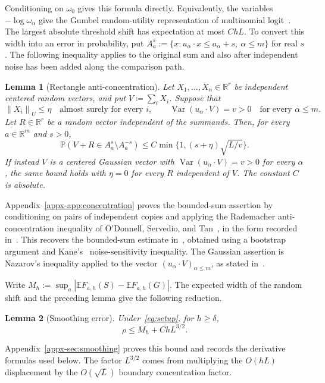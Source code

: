 \documentclass[11pt,letterpaper]{article}
\newtheorem{lemma}{Lemma}
\theoremstyle{remark}
\newcommand{\E}{\mathbb E}
\newcommand{\Pp}{\mathbb P}
\newcommand{\R}{\mathbb R}
\newcommand{\Var}{\operatorname{Var}}
\newcommand{\norm}[1]{\left\lVert#1\right\rVert}
\begin{document}
Conditioning on \(\omega_0\) gives this formula directly. Equivalently,
the variables \(-\log\omega_\alpha\) give the Gumbel random-utility
representation of multinomial logit~\cite[Section~2.6]{Yellott1977}.
The largest absolute threshold shift has expectation at most \(ChL\).
To convert this width into an error in probability, put
\(A_a^s:=\{x:u_\alpha\cdot x\le a_\alpha+s,\ \alpha\le m\}\) for
real \(s\). The following inequality applies to the original sum and
also after independent noise has been added along the comparison path.

\begin{lemma}[Rectangle anti-concentration]\label{lem:concentration}
Let \(X_1,\ldots,X_n\in\R^r\) be independent centered random
vectors, and put \(V\coloneqq\sum_iX_i\). Suppose that
\[
 \norm{X_i}_U\le\eta\quad\text{almost surely for every }i,
 \qquad \Var(u_\alpha\cdot V)=v>0
                   \quad\text{for every }\alpha\le m.
\]
Let \(R\in\R^r\) be a random vector independent of the summands.
Then, for every \(a\in\R^m\) and \(s>0\),
\[
 \Pp(V+R\in A_a^s\setminus A_a^{-s})
 \le C\min\{1,(s+\eta)\sqrt{L/v}\}.
\]
If instead \(V\) is a centered Gaussian vector with
\(\Var(u_\alpha\cdot V)=v>0\) for every \(\alpha\), the same
bound holds with \(\eta=0\) for every \(R\) independent of \(V\).
The constant \(C\) is absolute.
\end{lemma}
Appendix~\ref{appx-app:concentration} proves the bounded-sum assertion
by conditioning on pairs of independent copies and applying the
Rademacher anti-concentration inequality of O'Donnell, Servedio,
and Tan~\cite{OST}, in the form recorded
in~\cite[Lemma~J.4]{CCKK2022}. This recovers the bounded-sum estimate
in~\cite[Lemma~2.1]{AL}, obtained using a bootstrap argument and
Kane's~\cite{Kane} noise-sensitivity inequality. The Gaussian assertion
is Nazarov's inequality applied to the vector
\((u_\alpha\cdot V)_{\alpha\le m}\), as stated
in~\cite[Lemma~A.1]{CCK2017}.

Write \(M_h:=\sup_a|\E F_{a,h}(S)-\E F_{a,h}(G)|\).
The expected width of the random shift and the preceding lemma give
the following reduction.
\begin{lemma}[Smoothing error]\label{lem:endpoint}
Under~\eqref{eq:setup}, for \(h\ge\delta\),
\begin{equation}
 \rho\le M_h+ChL^{3/2}.
 \label{eq:endpoint-min}
\end{equation}
\end{lemma}
Appendix~\ref{appx-sec:smoothing} proves this bound and records the
derivative formulas used below. The factor \(L^{3/2}\) comes from
multiplying the \(O(hL)\) displacement by the \(O(\sqrt L)\) boundary
concentration factor.
\end{document}
